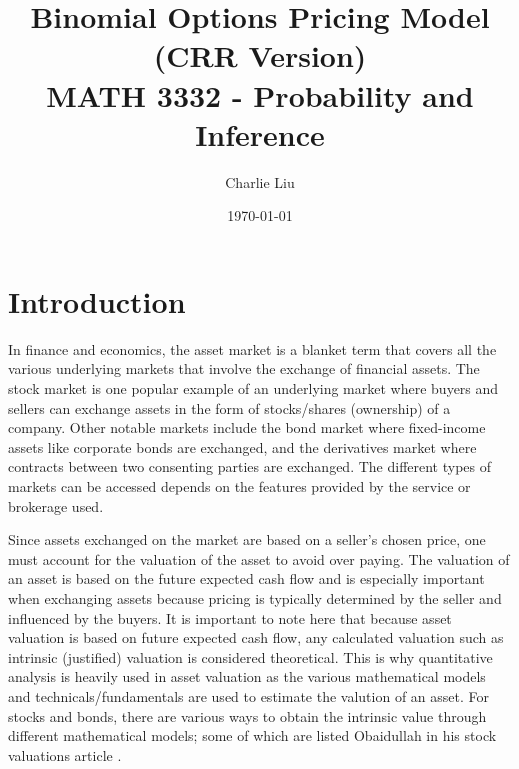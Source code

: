 \documentclass[12pt, letterpaper]{article}
\begin{document}
\title{Binomial Options Pricing Model (CRR Version)\\
\large MATH 3332 - Probability and Inference}
\author{Charlie Liu}
\date{\today}
\maketitle

\section*{Introduction}

In finance and economics, the asset market is a blanket term that covers all the various underlying markets that involve the exchange of financial assets.
The stock market is one popular example of an underlying market where buyers and sellers can exchange assets in the form of stocks/shares (ownership) of a company.
Other notable markets include the bond market where fixed-income assets like corporate bonds are exchanged, and the derivatives market where contracts between two consenting parties are exchanged.
The different types of markets can be accessed depends on the features provided by the service or brokerage used.

\medskip

Since assets exchanged on the market are based on a seller's chosen price, one must account for the valuation of the asset to avoid over paying.
The valuation of an asset is based on the future expected cash flow \cite{damodaran} and is especially important when exchanging assets because pricing is typically determined by the seller and influenced by the buyers.
It is important to note here that because asset valuation is based on future expected cash flow, any calculated valuation such as intrinsic (justified) valuation is considered theoretical.
This is why quantitative analysis is heavily used in asset valuation as the various mathematical models and technicals/fundamentals are used to estimate the valution of an asset.
For stocks and bonds, there are various ways to obtain the intrinsic value through different mathematical models; some of which are listed Obaidullah in his stock valuations article \cite{obaidullahxplaind}.

\medskip
\end{document}
